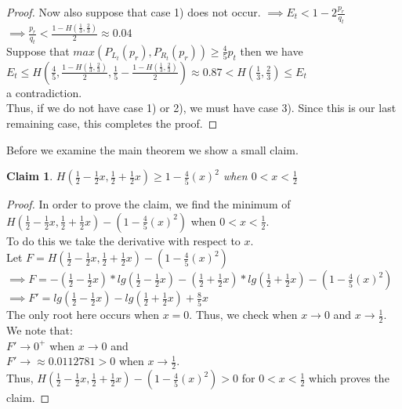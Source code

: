 \documentclass[letterpaper,12pt,titlepage,oneside,final]{book}
\theoremstyle{plain}
\begin{document}
\begin{proof}
Now also suppose that case 1) does not occur. 
$\implies E_t < 1-2\frac{p_r}{q_t}$ \\
$\implies \frac{p_r}{q_t} < \frac{1-H(\frac{1}{3}, \frac{2}{3})}{2} \approx 0.04$ \\
Suppose that $max(P_{L_t}(p_r), P_{R_t}(p_r)) \geq \frac{4}{5} p_t$ then we have \\
$E_t \leq H(\frac{4}{5}, \frac{1-H(\frac{1}{3}, \frac{2}{3})}{2}, \frac{1}{5}-\frac{1-H(\frac{1}{3}, \frac{2}{3})}{2}) \approx 0.87 < H(\frac{1}{3}, \frac{2}{3}) \leq E_t$ \\ 
a contradiction. \\
Thus, if we do not have case 1) or 2), we must have case 3). Since this is our last remaining case, this completes the proof.
 

\end{proof}

Before we examine the main theorem we show a small claim.

\newtheorem{claim}{Claim}
\begin{claim}
$H(\frac{1}{2}-\frac{1}{2} x, \frac{1}{2} + \frac{1}{2} x) \geq 1- \frac{4}{5} (x)^2$ when $0 < x < \frac{1}{2}$
\end{claim}

\begin{proof}
In order to prove the claim, we find the minimum of \\
$H(\frac{1}{2}-\frac{1}{2} x, \frac{1}{2} + \frac{1}{2} x) - (1 - \frac{4}{5} (x)^2)$ when $0 < x < \frac{1}{2}$. \\
To do this we take the derivative with respect to $x$. \\
Let $F= H(\frac{1}{2}-\frac{1}{2} x, \frac{1}{2} + \frac{1}{2} x) - (1 - \frac{4}{5} (x)^2)$ \\
$\implies F = - (\frac{1}{2}-\frac{1}{2} x)* lg(\frac{1}{2}-\frac{1}{2} x) - (\frac{1}{2} + \frac{1}{2} x)*lg(\frac{1}{2} + \frac{1}{2} x) - (1 - \frac{4}{5} (x)^2)$ \\
$\implies F' = lg(\frac{1}{2}-\frac{1}{2} x) - lg(\frac{1}{2} + \frac{1}{2} x) + \frac{8}{5}x$ \\ 
The only root here occurs when $x = 0$. Thus, we check when $x \rightarrow 0$ and $x \rightarrow \frac{1}{2}$. We note that: \\
$F' \rightarrow 0^{+}$ when $x \rightarrow 0$ and \\
$F' \rightarrow \approx 0.0112781 > 0$ when $x \rightarrow \frac{1}{2}$. \\
Thus, $H(\frac{1}{2}-\frac{1}{2} x, \frac{1}{2} + \frac{1}{2} x) - (1 - \frac{4}{5} (x)^2) > 0$ for $ 0 < x < \frac{1}{2}$ which proves the claim.
\end{proof} 
\end{document}
